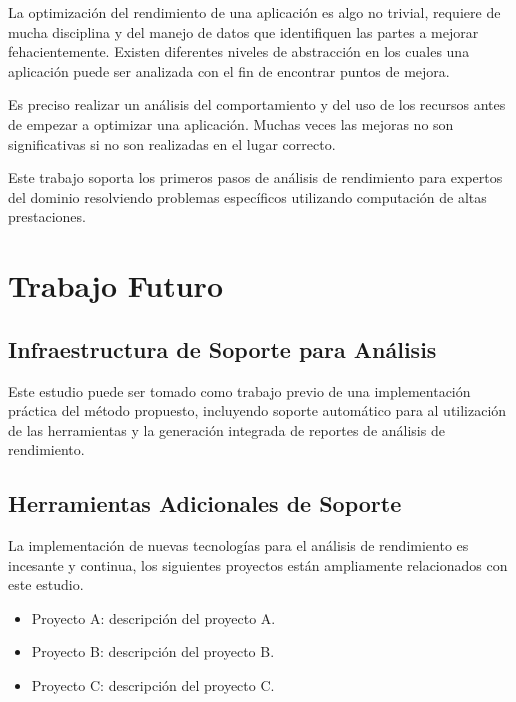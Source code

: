 \documentclass[a4paper]{report}
\begin{document}
\bigskip

La optimización del rendimiento de una aplicación es algo no trivial, requiere de mucha disciplina y del manejo de datos que identifiquen las partes a mejorar fehacientemente.
Existen diferentes niveles de abstracción en los cuales una aplicación puede ser analizada con el fin de encontrar puntos de mejora. 

\bigskip

Es preciso realizar un análisis del comportamiento y del uso de los recursos antes de
empezar a optimizar una aplicación. Muchas veces las mejoras no son significativas si no son realizadas en el lugar correcto.

\bigskip

Este trabajo soporta los primeros pasos de análisis de rendimiento para expertos del dominio resolviendo problemas específicos utilizando computación de altas prestaciones.

\chapter{Trabajo Futuro}\label{chapter:future}

\section{Infraestructura de Soporte para Análisis}

Este estudio puede ser tomado como trabajo previo de una implementación práctica del método propuesto,
incluyendo soporte automático para al utilización de las herramientas y la generación integrada de
reportes de análisis de rendimiento.

\section{Herramientas Adicionales de Soporte}

La implementación de nuevas tecnologías para el análisis de rendimiento
es incesante y continua, los siguientes proyectos están ampliamente
relacionados con este estudio.

\begin{itemize}
\item Proyecto A: descripción del proyecto A.
\item Proyecto B: descripción del proyecto B.
\item Proyecto C: descripción del proyecto C.
\end{itemize}
\end{document}
